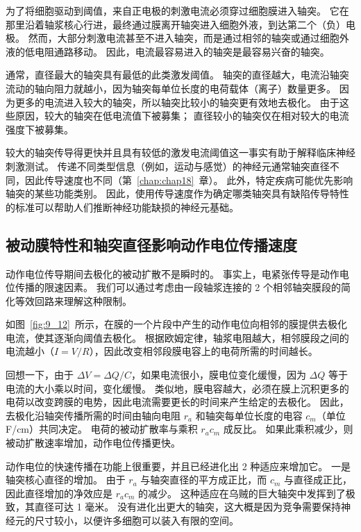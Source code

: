 为了将细胞驱动到阈值，来自正电极的刺激电流必须穿过细胞膜进入轴突。
它在那里沿着轴浆核心行进，最终通过膜离开轴突进入细胞外液，到达第二个（负）电极。
然而，大部分刺激电流甚至不进入轴突，而是通过相邻的轴突或通过细胞外液的低电阻通路移动。
因此，电流最容易进入的轴突是最容易兴奋的轴突。


通常，直径最大的轴突具有最低的此类激发阈值。
轴突的直径越大，电流沿轴突流动的轴向阻力就越小，因为轴突每单位长度的电荷载体（离子）数量更多。
因为更多的电流进入较大的轴突，所以轴突比较小的轴突更有效地去极化。
由于这些原因，较大的轴突在低电流值下被募集；
直径较小的轴突仅在相对较大的电流强度下被募集。


较大的轴突传导得更快并且具有较低的激发电流阈值这一事实有助于解释临床神经刺激测试。
传递不同类型信息（例如，运动与感觉）的神经元通常轴突直径不同，因此传导速度也不同（第~\ref{chap:chap18}~章）。
此外，特定疾病可能优先影响轴突的某些功能类别。
因此，使用传导速度作为确定哪类轴突具有缺陷传导特性的标准可以帮助人们推断神经功能缺损的神经元基础。



\subsection{被动膜特性和轴突直径影响动作电位传播速度}

动作电位传导期间去极化的被动扩散不是瞬时的。
事实上，电紧张传导是动作电位传播的限速因素。
我们可以通过考虑由一段轴浆连接的 2 个相邻轴突膜段的简化等效回路来理解这种限制。


如图~\ref{fig:9_12}~所示，在膜的一个片段中产生的动作电位向相邻的膜提供去极化电流，使其逐渐向阈值去极化。 
根据欧姆定律，轴浆电阻越大，相邻膜段之间的电流越小（$I = V / R$），因此改变相邻段膜电容上的电荷所需的时间越长。


回想一下，由于 $\Delta V = \Delta Q / C$，如果电流很小，膜电位变化缓慢，因为 $\Delta Q$ 等于电流的大小乘以时间，变化缓慢。
类似地，膜电容越大，必须在膜上沉积更多的电荷以改变跨膜的电势，因此电流需要更长的时间来产生给定的去极化。
因此，去极化沿轴突传播所需的时间由轴向电阻 $r_a$ 和轴突每单位长度的电容 $c_m$（单位 F/cm）共同决定。
电荷的被动扩散率与乘积 $r_a c_m$ 成反比。
如果此乘积减少，则被动扩散速率增加，动作电位传播更快。


动作电位的快速传播在功能上很重要，并且已经进化出 2 种适应来增加它。
一是轴突核心直径的增加。
由于 $r_a$ 与轴突直径的平方成正比，而 $c_m$ 与直径成正比，因此直径增加的净效应是 $r_a c_m$ 的减少。
这种适应在乌贼的巨大轴突中发挥到了极致，其直径可达 1 毫米。
没有进化出更大的轴突，这大概是因为竞争需要保持神经元的尺寸较小，以便许多细胞可以装入有限的空间。


